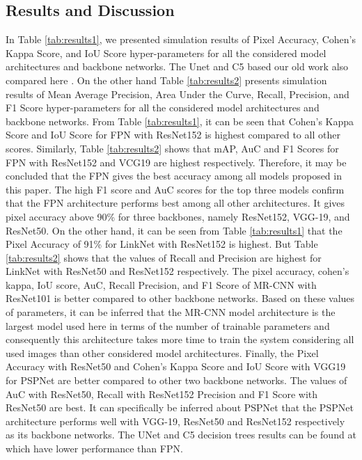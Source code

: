 \documentclass[a4paper,12pt]{spieman}  %
\begin{document}
\begin{spacing}{1}
\subsection{Results and Discussion}
\label{RD}
In Table \ref{tab:results1}, we presented simulation results of Pixel Accuracy, Cohen's Kappa Score, and IoU Score hyper-parameters for all the considered model architectures and backbone networks. The Unet and C5 based our old work also compared here \cite{Halder1}. On the other hand Table \ref{tab:results2} presents simulation results of Mean Average Precision, Area Under the Curve, Recall, Precision, and F1 Score hyper-parameters for all the considered model architectures and backbone networks.
From Table \ref{tab:results1}, it can be seen that Cohen’s Kappa Score and IoU Score for FPN with ResNet152 is highest compared to all other scores. Similarly, Table \ref{tab:results2} shows that mAP, AuC and F1 Scores for FPN with ResNet152 and VCG19 are highest respectively. Therefore, it may be concluded that the FPN gives the best accuracy among all models proposed in this paper. The high F1 score and AuC scores for the top three models confirm that the FPN architecture performs best among all other architectures. It gives pixel accuracy above 90\% for three backbones, namely ResNet152, VGG-19, and ResNet50.
On the other hand, it can be seen from Table \ref{tab:results1} that the Pixel Accuracy of 91\% for LinkNet with ResNet152 is highest. But Table \ref{tab:results2} shows that the values of Recall and Precision are highest for LinkNet with ResNet50 and ResNet152 respectively.
The pixel accuracy, cohen's kappa, IoU score, AuC, Recall Precision, and F1 Score of MR-CNN with ResNet101 is better compared to other backbone networks. Based on these values of parameters, it can be inferred that the MR-CNN model architecture is the largest model used here in terms of the number of trainable parameters and consequently this architecture takes more time to train the system considering all used images than other considered model architectures.
Finally, the Pixel Accuracy with ResNet50 and Cohen’s Kappa Score and IoU Score with VGG19 for PSPNet are better compared to other two backbone networks. The values of AuC with ResNet50,  Recall with ResNet152 Precision and F1 Score with ResNet50 are best. It can specifically be inferred about PSPNet that the PSPNet architecture performs well with VGG-19, ResNet50 and ResNet152 respectively as its backbone networks. The UNet and C5 decision trees results can be found at \citep{Halder1} which have lower performance than FPN.

\end{spacing}
\end{document}
